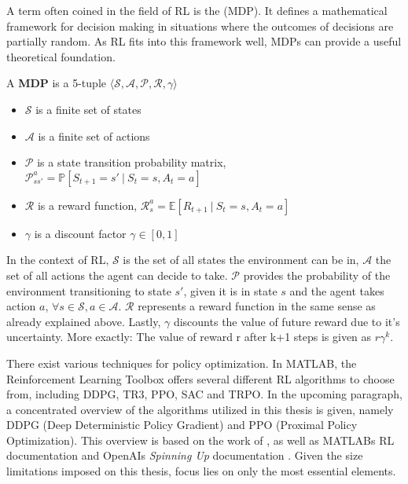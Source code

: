 A term often coined in the field of RL is the  (MDP).
It defines a mathematical framework for decision making in situations where the outcomes of decisions are partially random.
As RL fits into this framework well, MDPs can provide a useful theoretical foundation.\\

\begin{definition}
	A \textbf{MDP} is a 5-tuple $\langle \mathcal{S,A,P,R,\gamma} \rangle$
	\begin{itemize}
		\item $\mathcal{S}$ is a finite set of states
		\item $\mathcal{A}$ is a finite set of actions
		\item $\mathcal{P}$ is a state transition probability matrix, $\mathcal{P}_{ss'}^a = \mathbb{P}[S_{t+1} = s' \ | \ S_t = s, A_t = a	] $
		\item $\mathcal{R}$ is a reward function, $\mathcal{R}_s^a = \mathbb{E}[R_{t+1} \ | \ S_t = s, A_t = a]$
		\item $\mathcal{\gamma}$ is a discount factor $\mathcal{\gamma} \in [0,1]$
	\end{itemize}
\end{definition}

In the context of RL, $\mathcal{S}$ is the set of all states the environment can be in, $\mathcal{A}$ the set of all actions the agent can decide to take.
$\mathcal{P}$ provides the probability of the environment transitioning to state $s'$, given it is in state $s$ and the agent takes action $a$, $\forall s \in \mathcal{S}, a \in \mathcal{A}$.
$\mathcal{R}$ represents a reward function in the same sense as already explained above.
Lastly, $\mathcal{\gamma}$ discounts the value of future reward due to it's uncertainty.
More exactly: The value of  reward r after k+1 steps is given as $r\mathcal{\gamma}^k$.

There exist various techniques for policy optimization.
In MATLAB, the Reinforcement Learning Toolbox offers several different RL algorithms to choose from, including DDPG, TR3, PPO, SAC and TRPO.
In the upcoming paragraph, a concentrated overview of the algorithms utilized in this thesis is given, namely DDPG (Deep Deterministic Policy Gradient) and PPO (Proximal Policy Optimization).
This overview is based on the work of \cite{silver2015}, as well as MATLABs RL documentation and OpenAIs \textit{Spinning Up} documentation \parencite{matlabRLDocumentation, openAI_SpinningUp_Documentation}.
Given the size limitations imposed on this thesis, focus lies on only the most essential elements.

